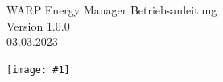 \documentclass[a4paper,10pt]{article}
\title{}
\author{}
\newcommand{\gfx}[1]{\texttt{[image: \#1]}}
\begin{document}
\pagestyle{empty}
\begin{titlepage}
	\vspace*{-3.08cm}
	\colorbox{boxgray}{}
	\vfill
	\begin{center}
		\Huge
		WARP Energy Manager Betriebsanleitung\\\vspace{1cm}
		\large
		Version 1.0.0\\\vspace{0.25cm}
		03.03.2023
	\end{center}
	\vfill \gfx{./img/resized/warp-energy-manager.png}
\end{titlepage}
\newpage
\null
\newpage
\pagestyle{fancy}
\end{document}
